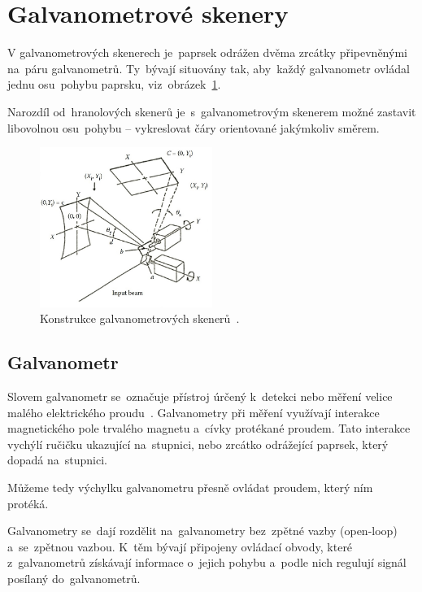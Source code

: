\section{Galvanometrové skenery}
V galvanometrových skenerech je~paprsek odrážen dvěma zrcátky připevněnými na~páru galvanometrů. Ty~bývají situovány tak, aby~každý galvanometr ovládal jednu osu~pohybu paprsku, viz~obrázek~\ref{fig:scanner-constructions}.~\cite{scanning-handbook}

Narozdíl od~hranolových skenerů je~s~galvanometrovým skenerem možné zastavit libovolnou osu~pohybu -- vykreslovat čáry orientované jakýmkoliv směrem.

\begin{figure}[htb]
  \centering
  \includegraphics[width=0.5\textwidth]{img/scanner-constructions.jpg}
  \caption{\label{fig:scanner-constructions} Konstrukce galvanometrových skenerů~\cite{scanning-handbook}.}
\end{figure}

\subsection{Galvanometr}
Slovem galvanometr se~označuje přístroj úrčený k~detekci nebo měření velice malého elektrického proudu~\cite{galvo-definition}. Galvanometry při měření využívají interakce magnetického pole trvalého magnetu a~cívky protékané proudem. Tato interakce vychýlí ručičku ukazující na~stupnici, nebo zrcátko odrážející paprsek, který dopadá na~stupnici.~\cite{wiki-galvo}

Můžeme tedy výchylku galvanometru přesně ovládat proudem, který ním protéká.

Galvanometry se~dají rozdělit na~galvanometry bez~zpětné vazby (open-loop) a~se~zpětnou vazbou. K~těm bývají připojeny ovládací obvody, které z~galvanometrů získávají informace o~jejich pohybu a~podle nich regulují signál posílaný do~galvanometrů.~\cite{wiki-galvo}

